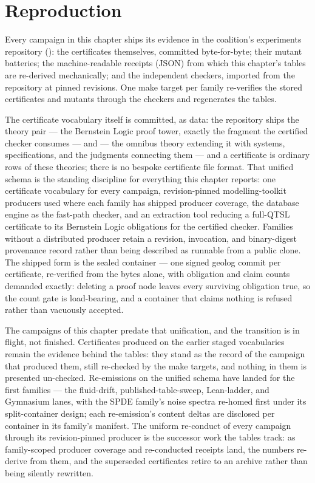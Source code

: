 \section{Reproduction}
\label{sec:exp-repro}

Every campaign in this chapter ships its evidence in the coalition's
experiments repository
(): the certificates
themselves, committed byte-for-byte; their mutant batteries; the
machine-readable receipts (JSON) from which this chapter's tables are
re-derived mechanically; and the independent checkers, imported from
the  repository at pinned revisions. One make target per
family re-verifies the stored certificates and mutants through the
checkers and regenerates the tables.

The certificate vocabulary itself is committed, as data: the
 repository ships the theory pair
 --- the Bernstein Logic proof
tower, exactly the fragment the certified checker consumes --- and
 --- the omnibus theory extending it with
systems, specifications, and the judgments connecting them --- and a
certificate is ordinary rows of these theories; there is no bespoke
certificate file format. That unified schema is the standing
discipline for everything this chapter reports: one certificate
vocabulary for every campaign, revision-pinned modelling-toolkit producers
used where each family has shipped producer coverage, the database engine as
the fast-path checker, and an extraction tool reducing a full-QTSL
certificate to its Bernstein Logic obligations for the certified checker.
Families without a distributed producer retain a revision, invocation, and
binary-digest provenance record rather than being described as runnable from
a public clone. The shipped form is the
sealed container --- one signed geolog commit per certificate,
re-verified from the bytes alone, with obligation and claim counts
demanded exactly: deleting a proof node leaves every surviving
obligation true, so the count gate is load-bearing, and a container
that claims nothing is refused rather than vacuously accepted.

The campaigns of this chapter predate that unification, and the
transition is in flight, not finished. Certificates produced on the
earlier staged vocabularies remain the evidence behind the tables:
they stand as the record of the campaign that produced them, still
re-checked by the make targets, and nothing in them is presented
un-checked. Re-emissions on the unified schema have landed for the
first families --- the fluid-drift, published-table-sweep,
Lean-ladder, and Gymnasium lanes, with the SPDE family's noise
spectra re-homed first under its split-container design; each
re-emission's content deltas are disclosed per container in its
family's manifest. The uniform re-conduct of every campaign through its revision-pinned
producer is the successor work the tables track: as family-scoped producer
coverage and re-conducted receipts land, the numbers re-derive from them, and
the superseded certificates retire to an archive rather than being silently
rewritten.

